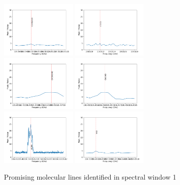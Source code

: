 \documentclass{aa}
\begin{document}
\newpage
   \begin{figure}
    \includegraphics[width=0.33\textwidth]{spw1_(CH3)2CO}
    \includegraphics[width=0.33\textwidth]{spw1_CCCO}
    \includegraphics[width=0.33\textwidth]{spw1_CH3OCHO}
    \includegraphics[width=0.33\textwidth]{spw1_CNCHO}
    \includegraphics[width=0.33\textwidth]{spw1_HC3N}
    \includegraphics[width=0.33\textwidth]{spw1_SO2}
    \caption{Promising molecular lines identified in spectral window 1}
   \end{figure}
\end{document}
